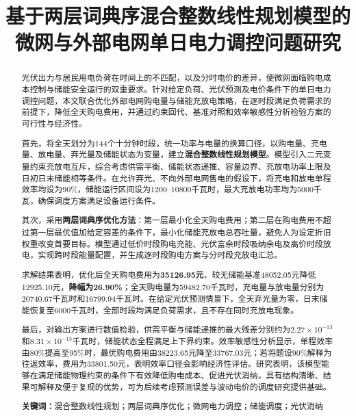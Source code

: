 \documentclass[UTF8,a4paper,12pt,fontset=fandol]{ctexart}
\title{\heiti\bfseries 基于两层词典序混合整数线性规划模型的微网与外部电网单日电力调控问题研究}
\author{}
\date{}
\numberwithin{equation}{section}
\begin{document}
\maketitle
\vspace{-2.2em}

\begingroup
\small
{}
\begin{abstract}
光伏出力与居民用电负荷在时间上的不匹配，以及分时电价的差异，使微网面临购电成本控制与储能安全运行的双重要求。针对给定负荷、光伏预测及电价条件下的单日电力调控问题，本文联合优化外部电网购电量与储能充放电策略，在逐时段满足负荷需求的前提下，降低全天购电费用，并通过约束回代、基准对照和效率敏感性分析检验方案的可行性与经济性。

首先，将全天划分为144个十分钟时段，统一功率与电量的换算口径，以购电量、充电量、放电量、弃光量及储能状态为变量，建立\textbf{混合整数线性规划模型}。模型引入二元变量约束充放电互斥，综合考虑供需平衡、储能状态递推、容量边界、充放电功率上限及日初日末储能相等条件。在允许弃光、不向外部电网售电的假设下，将充电和放电单程效率均设为90\%，储能运行区间设为1200--10800千瓦时，最大充放电功率均为5000千瓦，确保调度方案满足设备运行条件。

其次，采用\textbf{两层词典序优化方法}：第一层最小化全天购电费用；第二层在购电费用不超过第一层最优值加给定容差的条件下，最小化储能充放电总吞吐量，避免人为设定折旧权重改变首要目标。模型通过低价时段购电充能、光伏富余时段吸纳余电及高价时段放电，实现跨时段能量配置，并生成逐时段购电方案与分时段充放电汇总。

求解结果表明，优化后全天购电费用为\textbf{35126.95元}，较无储能基准48052.05元降低12925.10元，\textbf{降幅为26.90\%}；全天购电量为59482.70千瓦时，充电量与放电量分别为20740.67千瓦时和16799.94千瓦时。在给定光伏预测情景下，全天弃光量为零，日末储能恢复至6000千瓦时，全部时段均满足负荷需求，且不存在同时充放电现象。

最后，对输出方案进行数值检验，供需平衡与储能递推的最大残差分别约为$2.27\times10^{-13}$和$8.31\times10^{-13}$千瓦时，储能状态全程满足上下界约束。效率敏感性分析显示，单程效率由80\%提高至95\%时，最优购电费用由38223.65元降至33767.03元；若将题设90\%解释为往返效率，费用为33801.50元，表明效率口径会影响经济性评估。研究表明，该模型能够在满足储能物理约束的条件下有效降低购电成本、促进光伏消纳，具有结构清晰、结果可解释及便于复现的优势，可为后续考虑预测误差与波动电价的调度研究提供基础。

\par\medskip
\noindent\textbf{关键词：}混合整数线性规划；两层词典序优化；微网电力调控；储能调度；光伏消纳
\end{abstract}
\endgroup
\clearpage
\end{document}
